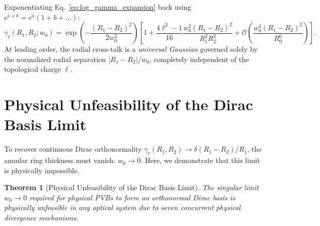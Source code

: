 \documentclass{optica-article}
\newtheorem{theorem}{Theorem}
\begin{document}
Exponentiating Eq.~\eqref{eq:log_gamma_expansion} back using $e^{a + b} = e^a (1 + b + \dots)$:
\begin{equation}
\boxed{\gamma_\ell(R_1, R_2; w_0) = \exp\left( - \frac{(R_1 - R_2)^2}{2 w_0^2} \right) \left[ 1 + \frac{4\ell^2 - 1}{16} \frac{w_0^2 (R_1 - R_2)^2}{R_1^2 R_2^2} + \mathcal{O}\left( \frac{w_0^4 (R_1 - R_2)^2}{R_0^6} \right) \right].}
\label{eq:asymptotic_overlap}
\end{equation}
At leading order, the radial cross-talk is a \emph{universal Gaussian} governed solely by the normalized radial separation $|R_1 - R_2| / w_0$, completely independent of the topological charge $\ell$.

\section{Physical Unfeasibility of the Dirac Basis Limit}
\label{sec:unfeasibility}

To recover continuous Dirac orthonormality $\gamma_\ell(R_1, R_2) \to \delta(R_1 - R_2) / R_1$, the annular ring thickness must vanish: $w_0 \to 0$. Here, we demonstrate that this limit is physically impossible.

\begin{theorem}[Physical Unfeasibility of the Dirac Basis Limit]
\label{thm:unfeasibility}
The singular limit $w_0 \to 0$ required for physical PVBs to form an orthonormal Dirac basis is physically unfeasible in any optical system due to seven concurrent physical divergence mechanisms.
\end{theorem}
\end{document}
